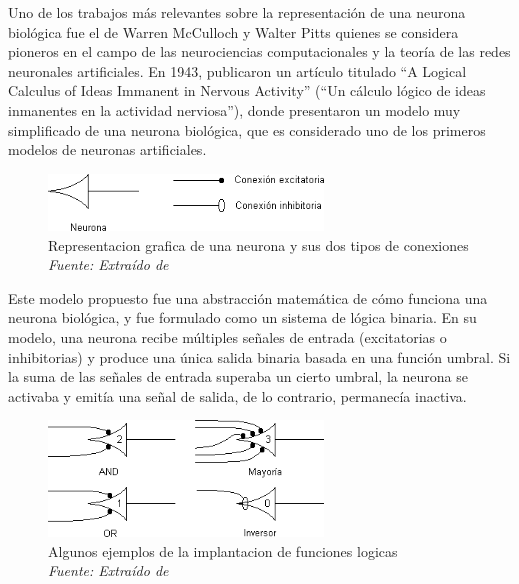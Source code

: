 Uno de los trabajos más relevantes sobre la representación de una neurona biológica fue el de Warren McCulloch y Walter Pitts quienes se considera pioneros en el campo de las neurociencias computacionales y la teoría de las redes neuronales artificiales. En 1943, publicaron un artículo titulado ``A Logical Calculus of Ideas Immanent in Nervous Activity'' (``Un cálculo lógico de ideas inmanentes en la actividad nerviosa''), donde presentaron un modelo muy simplificado de una neurona biológica, que es considerado uno de los primeros modelos de neuronas artificiales\cite{mcculloch1943logical}.

\begin{figure}[h!]
	\includegraphics[width=0.65\textwidth]{capitulo2/figuras/an2.png}
	\caption[Representacion grafica de una neurona y sus dos tipos de conexiones]{Representacion grafica de una neurona y sus dos tipos de conexiones\\\textit{Fuente: Extraído de} \protect\cite[ p.4]{prieto2020modelo} }
	\label{fig:an2}
\end{figure}

Este modelo propuesto  fue una abstracción matemática de cómo funciona una neurona biológica, y fue formulado como un sistema de lógica binaria. En su modelo, una neurona recibe múltiples señales de entrada (excitatorias o inhibitorias) y produce una única salida binaria basada en una función umbral. Si la suma de las señales de entrada superaba un cierto umbral, la neurona se activaba y emitía una señal de salida, de lo contrario, permanecía inactiva.

\begin{figure}[h!]
	\includegraphics[width=0.65\textwidth]{capitulo2/figuras/an3.png}
	\caption[Algunos ejemplos de la implantacion de funciones logicas]{Algunos ejemplos de la implantacion de funciones logicas
		\\\textit{Fuente: Extraído de} \protect\cite[p. 5]{prieto2020modelo} }
	\label{fig:an3}
\end{figure}

